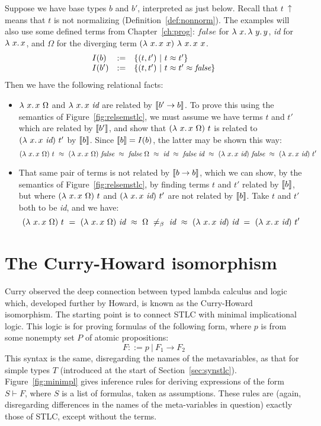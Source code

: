 Suppose we have base types $b$ and $b'$, interpreted as just below.
Recall that $t\ \uparrow$ means that $t$ is not normalizing
(Definition~\ref{def:nonnorm}).  The examples will also use some
defined terms from Chapter~\ref{ch:prog}: $\textit{false}$ for
$\lambda\ x.\, \lambda\ y.\, y$, \textit{id} for $\lambda\ x.\, x$, and $\Omega$ for
the diverging term $(\lam{x}{x\ x})\ \lam{x}{x\ x}$.
\[
\begin{array}{lll}
  I(b) & := & \{ (t,t')\ |\ t \approx t' \} \\
  I(b') & := & \{ (t,t')\ |\ t \approx t' \approx \textit{false} \}
\end{array}
\]
\noindent Then we have the following relational facts:
\begin{itemize}
\item $\lambda\ x.\, x\ \Omega$ and $\lambda\ x.\, x\ \textit{id}$ are related
  by $\llbracket b' \to b \rrbracket$.  To prove this using the semantics of
  Figure~\ref{fig:relsemstlc}, we must assume we have terms $t$ and
  $t'$ which are related by $\llbracket b' \rrbracket$, and show that
  $(\lambda\ x.\, x\ \Omega)\ t$ is related to $(\lam{x}{x\ \textit{id}})\ t'$ by
  $\llbracket b \rrbracket$.  Since $\llbracket b \rrbracket = I(b)$, the latter may be shown this
  way:
  \[
  (\lam{x}{x\ \Omega})\ t \ \betaeq \  (\lam{x}{x\ \Omega})\ \textit{false} \ \betaeq \ \textit{false}\ \Omega\ \betaeq\ \textit{id} \ \betaeq\ \textit{false}\ \textit{id}\ \betaeq \ (\lam{x}{x\ \textit{id}})\ \textit{false} \ \betaeq \ (\lam{x}{x\ \textit{id}})\ t'
      \]

 \item That same pair of terms is not related by $\llbracket b \to b \rrbracket$,
      which we can show, by the semantics of Figure~\ref{fig:relsemstlc},
      by finding terms $t$ and $t'$ related by $\llbracket b \rrbracket$, but
      where $(\lambda\ x.\, x\ \Omega)\ t$ and $(\lam{x}{x\ \textit{id}})\ t'$
      are not related by $\llbracket b \rrbracket$.  Take $t$ and $t'$ both to be \textit{id},
      and we have:
     \[
     (\lam{x}{x\ \Omega})\ t\ =\ (\lam{x}{x\ \Omega})\ \textit{id}\ \betaeq\ \Omega \ \neq_\beta\ \textit{id}\ \betaeq\ (\lam{x}{x\ \textit{id}})\ \textit{id}\ = \ (\lam{x}{x\ \textit{id}})\ t'
     \]
     \end{itemize}

\section{The Curry-Howard isomorphism}

Curry observed the deep connection between typed lambda calculus and
logic which, developed further by Howard, is known as the Curry-Howard
isomorphism.  The starting point is to connect STLC with minimal
implicational logic.  This logic is for proving formulas of the
following form, where $p$ is from some nonempty set $P$ of atomic
propositions:
\[
F ::= p\ |\ F_1 \to F_2
\]
\noindent This syntax is the same, disregarding the names of the
metavariables, as that for simple types $T$ (introduced at the start
of Section~\ref{sec:synstlc}).  Figure~\ref{fig:minimpl} gives
inference rules for deriving expressions of the form $S \vdash F$,
where $S$ is a list of formulas, taken as assumptions.  These rules
are (again, disregarding differences in the names of the
meta-variables in question) exactly those of STLC, except without
the terms.

